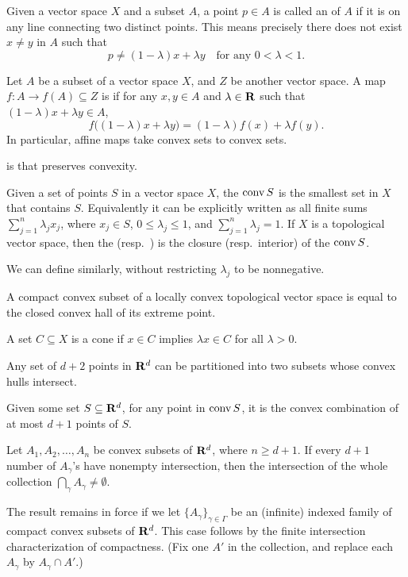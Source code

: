     Given a vector space $X$ and a subset $A$, a point $p\in A$ is called an  of $A$ if it is on any line connecting two distinct points. This means precisely there does not exist $x  \neq y$ in $A$ such that  \[
        p \neq (1-\lambda )x + \lambda y\quad \text{for any }0< \lambda <1.
    \]

    Let $A$ be a subset of a vector space $X$, and $Z$ be another vector space.
    A map $f \colon A \to f(A) \subseteq Z$ is  if for any $x,y \in A$ and $\lambda \in \mathbf{R}$ such that $(1-\lambda) x + \lambda y \in A$, \[
        f\bigl((1-\lambda) x + \lambda y\bigr) = (1-\lambda)f(x) + \lambda f(y).
    \] In particular, affine maps take convex sets to convex sets.
    
    is that preserves convexity. 

    Given a set of points $S$ in a vector space $X$, the  $\operatorname{conv} S$ is the smallest set in $X$ that contains $S$. Equivalently it can be explicitly written as all finite sums $\sum_{j=1}^n \lambda_j x_j$, where $x_j \in S$, $0\leq \lambda_j \leq 1$, and $\sum_{j=1}^n \lambda_j = 1$. If $X$ is a topological vector space, then the  (resp.\ ) is the closure (resp.\ interior) of the $\operatorname{conv} S$.

    We can define  similarly, without restricting $\lambda_j$ to be nonnegative.

\begin{namedthm}
    A compact convex subset of a locally convex topological vector space is equal to the closed convex hall of its extreme point.
\end{namedthm}

A set $C \subseteq X$ is a cone if $x \in C$ implies $\lambda x \in C$ for all $\lambda > 0$.

\begin{namedthm}
    Any set of $d+2$ points in $\mathbf{R}^d$ can be partitioned into two subsets whose convex hulls intersect.
\end{namedthm}

\begin{namedthm}
    Given some set $S \subseteq \mathbf{R}^d$, for any point in $\operatorname{conv} S$, it is the convex combination of at most $d+1$ points of $S$.
\end{namedthm}

\begin{namedthm}
    Let $A_1,A_2,\dotsc,A_n$ be convex subsets of $\mathbf{R}^d$, where $n \geq d + 1$. If every $d+1$ number of $A_\gamma$'s have nonempty intersection, then the intersection of the whole collection $\bigcap_\gamma A_\gamma \neq \emptyset$.

    The result remains in force if we let $\{A_\gamma\}_{\gamma\in \Gamma}$ be an (infinite) indexed family of compact convex subsets of $\mathbf{R}^d$. This case follows by the finite intersection characterization of compactness. (Fix one $A'$ in the collection, and replace each $A_\gamma$ by $A_\gamma \cap A'$.)
\end{namedthm}

